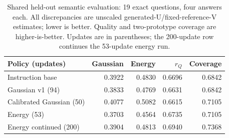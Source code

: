 \begin{table}[htbp]
\centering\small
\caption{Shared held-out semantic evaluation: 19 exact questions, four answers each. All discrepancies are unscaled generated-U/fixed-reference-V estimates; lower is better. Quality and two-prototype coverage are higher-is-better. Updates are in parentheses; the 200-update row continues the 53-update energy run.}\label{tab:semantic-new}
\begin{tabular}{@{}lrrrr@{}}
\toprule
Policy (updates) & Gaussian & Energy & $r_Q$ & Coverage\\
\midrule
Instruction base & 0.3922 & 0.4830 & 0.6696 & 0.6842\\
Gaussian v1 (94) & 0.3833 & 0.4769 & 0.6631 & 0.6842\\
Calibrated Gaussian (50) & 0.4077 & 0.5082 & 0.6615 & 0.7105\\
Energy (53) & 0.3703 & 0.4564 & 0.6735 & 0.7105\\
Energy continued (200) & 0.3904 & 0.4813 & 0.6940 & 0.7368\\
\bottomrule
\end{tabular}
\end{table}
